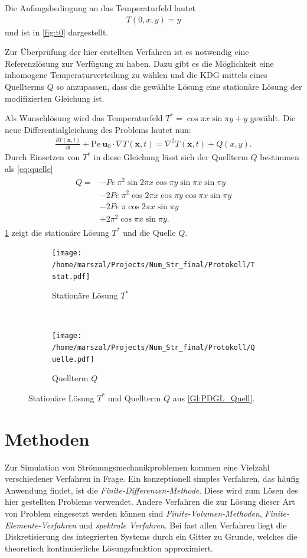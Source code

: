 Die Anfangsbedingung an das Temperaturfeld lautet
\begin{align}
  T(0,x,y) = y \nonumber
\end{align}
und ist in \cref{fig:t0} dargestellt.

Zur Überprüfung der hier erstellten Verfahren ist es notwendig eine Referenzlösung zur Verfügung zu haben.
Dazu gibt es die Möglichkeit eine inhomogene Temperaturverteilung zu wählen und die KDG mittels eines Quellterms $Q$ so anzupassen, dass die gewählte Lösung eine stationäre Lösung der modifizierten Gleichung ist.

Als Wunschlösung wird das Temperaturfeld $T^* = \cos{\pi x}\sin{\pi y}+y$ gewählt. Die neue Differentialgleichung des Problems
lautet nun:
\begin{align}
  \frac{\partial T(\boldsymbol x, t)}{\partial t} + \text{Pe}~ \boldsymbol{u}_0\cdot \nabla T(\boldsymbol x, t) = \nabla^2 T(\boldsymbol x, t) + Q(x,y). \label{Gl:PDGL_Quell}
\end{align}
Durch Einsetzen von $T^*$ in diese Gleichung lässt sich der Quellterm $Q$ bestimmen als \cref{eq:quelle}
\begin{align}
  \begin{split}
  Q = &- Pe~ \pi^2 \sin{2 \pi x} \cos{\pi y} \sin{\pi x} \sin{\pi y} \\
   &- 2 Pe~ \pi^2 \cos{2 \pi x} \cos{\pi y} \cos{\pi x} \sin{\pi y}\\
   &- 2 Pe~ \pi \cos{2 \pi x} \sin{\pi y}\\
   &+ 2 \pi^2 \cos{\pi x} \sin{\pi y}.
 \end{split}\label{eq:quelle}
\end{align}
\cref{fig:qtstat} zeigt die stationäre Lösung $T^*$ und die Quelle $Q$.
\begin{figure}
  \centering
  \begin{subfigure}[b]{0.45\textwidth}
  \texttt{[image: /home/marszal/Projects/Num\_Str\_final/Protokoll/Tstat.pdf]}\caption{\centering Stationäre Lösung $T^*$}
  \end{subfigure}
  ~
  \begin{subfigure}[b]{0.45\textwidth}
  \texttt{[image: /home/marszal/Projects/Num\_Str\_final/Protokoll/Quelle.pdf]}\caption{Quellterm $Q$}
\end{subfigure}\caption{Stationäre Lösung $T^*$ und Quellterm $Q$ aus \cref{Gl:PDGL_Quell}.}
  \label{fig:qtstat}
\end{figure}

\newpage
\section{Methoden}
Zur Simulation von Strömungsmechanikproblemen kommen eine Vielzahl verschiedener Verfahren in Frage.
Ein konzeptionell simples Verfahren, das häufig Anwendung findet, ist die \emph{Finite-Differenzen-Methode}.
Diese wird zum Lösen des hier gestellten Problems verwendet.
Andere Verfahren die zur Lösung dieser Art von Problem eingesetzt werden können sind \emph{Finite-Volumen-Methoden}, \emph{Finite-Elemente-Verfahren} und \emph{spektrale Verfahren}.
Bei fast allen Verfahren liegt die Diskretisierung des integrierten Systems durch ein Gitter zu Grunde, welches die theoretisch kontinuierliche Lösungsfunktion approximiert.
